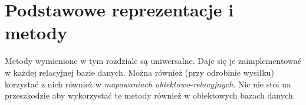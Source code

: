 \chapter{Podstawowe reprezentacje i metody}

Metody wymienione w tym rozdziale są uniwersalne. 
Daje się je zaimplementować w każdej relacyjnej bazie danych. 
Można również (przy odrobinie wysiłku) korzystać z nich również w \emph{mapowaniach obiektowo-relacyjnych}.
Nic nie stoi na przeszkodzie aby wykorzystać te metody również w obiektowych bazach danych.

